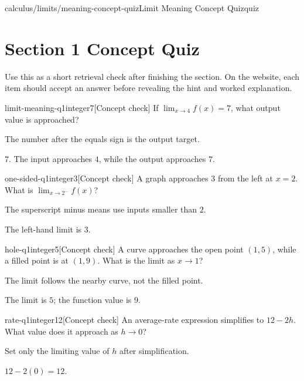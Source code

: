 \begin{webpage}{calculus/limits/meaning-concept-quiz}{Limit Meaning Concept Quiz}{quiz}
\section*{Section 1 Concept Quiz}

Use this as a short retrieval check after finishing the section. On the website, each item should accept an answer before revealing the hint and worked explanation.

\begin{bgcheck}{limit-meaning-q1}{integer}{7}[Concept check]
If \(\lim_{x\to 4}f(x)=7\), what output value is approached?
\begin{bghint}
The number after the equals sign is the output target.
\end{bghint}
\begin{bgreveal}
\(7\). The input approaches \(4\), while the output approaches \(7\).
\end{bgreveal}
\end{bgcheck}

\begin{bgcheck}{one-sided-q1}{integer}{3}[Concept check]
A graph approaches \(3\) from the left at \(x=2\). What is \(\lim_{x\to2^-}f(x)\)?
\begin{bghint}
The superscript minus means use inputs smaller than \(2\).
\end{bghint}
\begin{bgreveal}
The left-hand limit is \(3\).
\end{bgreveal}
\end{bgcheck}

\begin{bgcheck}{hole-q1}{integer}{5}[Concept check]
A curve approaches the open point \((1,5)\), while a filled point is at \((1,9)\). What is the limit as \(x\to1\)?
\begin{bghint}
The limit follows the nearby curve, not the filled point.
\end{bghint}
\begin{bgreveal}
The limit is \(5\); the function value is \(9\).
\end{bgreveal}
\end{bgcheck}

\begin{bgcheck}{rate-q1}{integer}{12}[Concept check]
An average-rate expression simplifies to \(12-2h\). What value does it approach as \(h\to0\)?
\begin{bghint}
Set only the limiting value of \(h\) after simplification.
\end{bghint}
\begin{bgreveal}
\(12-2(0)=12\).
\end{bgreveal}
\end{bgcheck}


\end{webpage}
